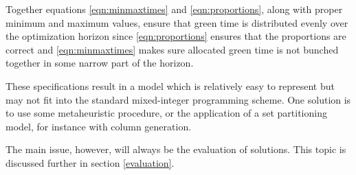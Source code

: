 Together equations \ref{eqn:minmaxtimes} and \ref{eqn:proportions}, along with proper minimum and maximum values, ensure that green time is distributed evenly over the optimization horizon since \ref{eqn:proportions} ensures that the proportions are correct and \ref{eqn:minmaxtimes} makes sure allocated green time is not bunched together in some narrow part of the horizon.

These specifications result in a model which is relatively easy to represent but may not fit into the standard mixed-integer programming scheme. One solution is to use some metaheuristic procedure, or the application of a set partitioning model, for instance with column generation.

The main issue, however, will always be the evaluation of solutions. This topic is discussed further in section \ref{evaluation}.